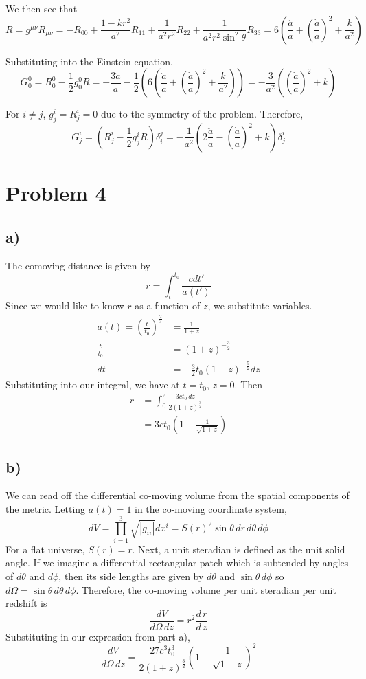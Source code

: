 \documentclass{article}
\newcommand{\tot}[2]{\frac{d\,#1}{d\,#2}}
\begin{document}
We then see that
\[R = g^{\mu\nu}R_{\mu\nu} = -R_{00}+\frac{1-kr^2}{a^2}R_{11}+\frac{1}{a^2r^2}R_{22}+\frac{1}{a^2r^2\sin^2\theta}R_{33}=6\left(\frac{\ddot{a}}{a}+\left(\frac{\dot{a}}{a}\right)^2+\frac{k}{a^2}\right)\]

Substituting into the Einstein equation,
\[G^0_0 = R^0_0-\frac{1}{2}g^0_0 R = -\frac{3\ddot{a}}{a}-\frac{1}{2}\left(6\left(\frac{\ddot{a}}{a}+\left(\frac{\dot{a}}{a}\right)^2+\frac{k}{a^2}\right)\right)=-\frac{3}{a^2}\left(\left(\frac{\dot{a}}{a}\right)^2+k\right)\]

For $i\not=j$, $g^i_j=R^i_j=0$ due to the symmetry of the problem. Therefore,
\[G^i_j = \left(R^i_j-\frac{1}{2}g^i_jR\right)\delta^j_i = -\frac{1}{a^2}\left(2\frac{\ddot{a}}{a}-\left(\frac{\dot{a}}{a}\right)^2+k\right)\delta^i_j\]
\section*{Problem 4}
\subsection*{a)}
The comoving distance is given by
\[r = \int_t^{t_0} \frac{c dt'}{a(t')}\]
Since we would like to know $r$ as a function of $z$, we substitute variables.
\begin{align*}
a(t) = \left(\frac{t}{t_0}\right)^{\frac{2}{3}}&=\frac{1}{1+z}\\
\frac{t}{t_0} &= (1+z)^{-\frac{3}{2}}\\
dt &= -\frac{3}{2}t_0(1+z)^{-\frac{5}{2}}dz
\end{align*}
Substituting into our integral, we have at $t=t_0$, $z=0$. Then
\begin{align*}
r &= \int_0^z \frac{3ct_0\,dz}{2(1+z)^{\frac{3}{2}}}\\
&=3ct_0\left(1-\frac{1}{\sqrt{1+z}}\right)
\end{align*}
\subsection*{b)}
We can read off the differential co-moving volume from the spatial components of the metric. Letting $a(t)=1$ in the co-moving coordinate system,
\[dV = \prod_{i=1}^3 \sqrt{|g_{ii}|}dx^i = S(r)^2\sin\theta\,dr\,d\theta\,d\phi\]
For a flat universe, $S(r)=r$. Next, a unit steradian is defined as the unit solid angle. If we imagine a differential rectangular patch which is subtended by angles of $d\theta$ and $d\phi$, then its side lengths are given by $d\theta$ and $\sin\theta\,d\phi$ so $d\Omega = \sin\theta\,d\theta\,d\phi$. Therefore, the co-moving volume per unit steradian per unit redshift is
\[\frac{dV}{d\Omega\,dz} = r^2\tot{r}{z}\]
Substituting in our expression from part a),
\[\frac{dV}{d\Omega\,dz} = \frac{27c^3t_0^3}{2(1+z)^\frac{3}{2}}\left(1-\frac{1}{\sqrt{1+z}}\right)^2\]
\end{document}
